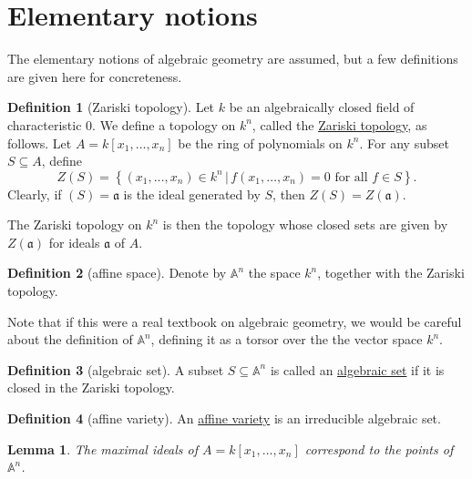 \documentclass[a4paper]{report}
\newcommand{\defn}[1]{\ul{#1}}
\theoremstyle{definition}
\newtheorem{definition}{Definition}[section]
\theoremstyle{plain}
\newtheorem{lemma}{Lemma}[section]
\theoremstyle{remark}
\begin{document}
\section{Elementary notions}
The elementary notions of algebraic geometry are assumed, but a few definitions are given here for concreteness.
\begin{definition}[Zariski topology]
  \label{def:zariskitopology}
  Let $k$ be an algebraically closed field of characteristic $0$. We define a topology on $k^{n}$, called the \defn{Zariski topology}, as follows. Let $A = k[x_{1},\dots,x_{n}]$ be the ring of polynomials on $k^{n}$. For any subset $S \subseteq A$, define
  \begin{equation*}
    Z(S) = \left\{ (x_{1},\dots,x_{n}) \in k^{n}\,\Big|\, f(x_{1},\dots,x_{n}) = 0\text{ for all }f \in S \right\}.
  \end{equation*}
  Clearly, if $(S) = \mathfrak{a}$ is the ideal generated by $S$, then $Z(S) = Z(\mathfrak{a})$.

  The Zariski topology on $k^{n}$ is then the topology whose closed sets are given by $Z(\mathfrak{a})$ for ideals $\mathfrak{a}$ of $A$.
\end{definition}

\begin{definition}[affine space]
  \label{def:affinespace}
  Denote by $\mathbb{A}^{n}$ the space $k^{n}$, together with the Zariski topology. 

  Note that if this were a real textbook on algebraic geometry, we would be careful about the definition of $\mathbb{A}^{n}$, defining it as a torsor over the the vector space $k^{n}$.
\end{definition} 

\begin{definition}[algebraic set]
  \label{def:algebraicset}
  A subset $S \subseteq \mathbb{A}^{n}$ is called an \defn{algebraic set} if it is closed in the Zariski topology.
\end{definition}

\begin{definition}[affine variety]
  \label{def:affinevariety}
  An \defn{affine variety} is an irreducible algebraic set.
\end{definition}

\begin{lemma}
  The maximal ideals of $A = k[x_{1}, \ldots, x_{n}]$ correspond to the points of $\mathbb{A}^{n}$.
\end{lemma}
\end{document}

